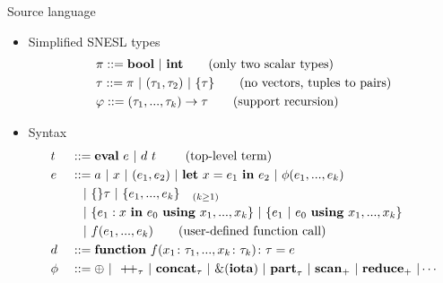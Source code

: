 \documentclass{beamer}
\begin{document}
\begin{frame}{Source language}

\begin{itemize}
\item Simplified SNESL types
	{\small\begin{align*} 
	& \pi ::= \mathbf{bool} \ | \ \mathbf{int}  \tag{only two scalar types}\\ 
	& \tau ::= \pi \ | \ (\tau_1,\tau_2) \ | \ \{\tau\} \tag{no vectors, tuples to pairs} \\
	& \varphi :: = (\tau_1,...,\tau_k) \rightarrow \tau  \tag{support recursion}
	\end{align*}}	
\item Syntax
	{\small \begin{alignat*}{2} 
	& t &&::= \*{eval} \ e \ | \ d \ t \  \tag{top-level term} \\
	& e &&::=  a \ | \ x  \ | \ (e_1,e_2) \ | \ \Let{x}{e_1}{e_2} \ | \ \hcall{\Tupk{e}} \\
	&   &&  \quad | \ \{ \}\tau \ | \ \{e_1,...,e_k \}_{\quad (k \ge 1)} \\
	&   && \quad | \ \Comp{e_1}{x}{e_0}{\usevarsk} \ | \ \RComp{e_1}{e_0}{\usevarsk}  \\
	&   && \quad | \ f (e_1,...,e_k)  \tag {user-defined function call} \\
	& d &&::= \*{function} \  f (x_1\colon{\tau_1}, ..., x_k\colon\tau_k)\colon{\tau} = e \\
	&\hcall && ::= \oplus \ | \  \ {\++}_{\tau} \ | \ \*{concat}_{\tau}  \ | \ \&(\*{iota})  \ | \ \*{part}_{\tau}  \ | \ \*{scan}_+ \ | \ \*{reduce}_{+} \ | \cdots \\	
	\end{alignat*}
   }
\end{itemize}
\end{frame}
\end{document}
